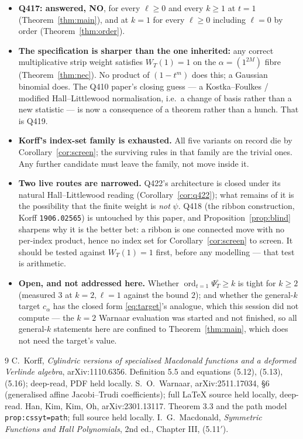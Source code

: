 \documentclass[11pt]{article}
\theoremstyle{plain}
\theoremstyle{definition}
\newcommand{\Psiop}{\Psi^{\circ}}
\newcommand{\ord}{\operatorname{ord}}
\begin{document}
\begin{itemize}[leftmargin=1.4em]
\item \textbf{Q417: answered, NO}, for every $\ell\ge0$ and every $k\ge1$ at $t=1$
      (Theorem~\ref{thm:main}), and at $k=1$ for every $\ell\ge0$ including $\ell=0$ by order
      (Theorem~\ref{thm:order}).
\item \textbf{The specification is sharper than the one inherited:} any correct multiplicative
      strip weight satisfies $W_T(1)=1$ on the $\alpha=(1^{2M})$ fibre
      (Theorem~\ref{thm:nec}). No product of $(1-t^m)$ does this; a Gaussian binomial does. The
      Q410 paper's closing guess --- a Kostka--Foulkes / modified Hall--Littlewood
      normalisation, i.e.\ a change of basis rather than a new statistic --- is now a consequence
      of a theorem rather than a hunch. That is Q419.
\item \textbf{Korff's index-set family is exhausted.} All five variants on record die by
      Corollary~\ref{cor:screen}; the surviving rules in that family are the trivial ones.
      Any further candidate must leave the family, not move inside it.
\item \textbf{Two live routes are narrowed.} Q422's architecture is closed under its natural
      Hall--Littlewood reading (Corollary~\ref{cor:q422}); what remains of it is the possibility
      that the finite weight is \emph{not} $\psi$. Q418 (the ribbon construction, Korff
      \texttt{1906.02565}) is untouched by this paper, and Proposition~\ref{prop:blind} sharpens
      why it is the better bet: a ribbon is one connected move with no per-index product, hence
      no index set for Corollary~\ref{cor:screen} to screen. It should be tested against
      $W_T(1)=1$ first, before any modelling --- that test is arithmetic.
\item \textbf{Open, and not addressed here.} Whether $\ord_{t=1}\Psiop_T\ge k$ is tight for
      $k\ge2$ (measured $3$ at $k=2,\ell=1$ against the bound $2$); and whether the general-$k$
      target $c_\alpha$ has the closed form \eqref{eq:target}'s analogue, which this session did
      not compute --- the $k=2$ Warnaar evaluation was started and not finished, so all general-$k$
      statements here are confined to Theorem~\ref{thm:main}, which does not need the target's
      value.
\end{itemize}

\begin{thebibliography}{9}
 C.~Korff, \emph{Cylindric versions of specialised Macdonald functions and a
deformed Verlinde algebra}, arXiv:1110.6356. Definition 5.5 and equations (5.12), (5.13), (5.16);
deep-read, PDF held locally.
 S.~O.~Warnaar, arXiv:2511.17034, \S6 (generalised affine Jacobi--Trudi
coefficients); full \LaTeX{} source held locally, deep-read.
 Han, Kim, Kim, Oh, arXiv:2301.13117. Theorem 3.3 and the path model
\texttt{prop:cssyt=path}; full source held locally.
 I.~G.~Macdonald, \emph{Symmetric Functions and Hall Polynomials}, 2nd ed.,
Chapter III, (5.11$'$).
\end{thebibliography}
\end{document}
